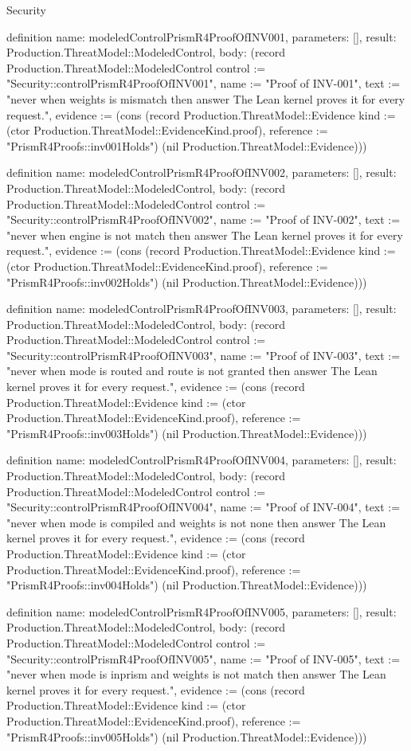 \begin{lexlean}{Security}
\begin{semanticmodule}
definition{
  name: modeledControlPrismR4ProofOfINV001,
  parameters: [],
  result: Production.ThreatModel::ModeledControl,
  body: (record Production.ThreatModel::ModeledControl {control := "Security::controlPrismR4ProofOfINV001", name := "Proof of INV-001", text := "never when weights is mismatch then answer The Lean kernel proves it for every request.", evidence := (cons (record Production.ThreatModel::Evidence {kind := (ctor Production.ThreatModel::EvidenceKind.proof), reference := "PrismR4Proofs::inv001Holds"}) (nil Production.ThreatModel::Evidence))})
}

definition{
  name: modeledControlPrismR4ProofOfINV002,
  parameters: [],
  result: Production.ThreatModel::ModeledControl,
  body: (record Production.ThreatModel::ModeledControl {control := "Security::controlPrismR4ProofOfINV002", name := "Proof of INV-002", text := "never when engine is not match then answer The Lean kernel proves it for every request.", evidence := (cons (record Production.ThreatModel::Evidence {kind := (ctor Production.ThreatModel::EvidenceKind.proof), reference := "PrismR4Proofs::inv002Holds"}) (nil Production.ThreatModel::Evidence))})
}

definition{
  name: modeledControlPrismR4ProofOfINV003,
  parameters: [],
  result: Production.ThreatModel::ModeledControl,
  body: (record Production.ThreatModel::ModeledControl {control := "Security::controlPrismR4ProofOfINV003", name := "Proof of INV-003", text := "never when mode is routed and route is not granted then answer The Lean kernel proves it for every request.", evidence := (cons (record Production.ThreatModel::Evidence {kind := (ctor Production.ThreatModel::EvidenceKind.proof), reference := "PrismR4Proofs::inv003Holds"}) (nil Production.ThreatModel::Evidence))})
}

definition{
  name: modeledControlPrismR4ProofOfINV004,
  parameters: [],
  result: Production.ThreatModel::ModeledControl,
  body: (record Production.ThreatModel::ModeledControl {control := "Security::controlPrismR4ProofOfINV004", name := "Proof of INV-004", text := "never when mode is compiled and weights is not none then answer The Lean kernel proves it for every request.", evidence := (cons (record Production.ThreatModel::Evidence {kind := (ctor Production.ThreatModel::EvidenceKind.proof), reference := "PrismR4Proofs::inv004Holds"}) (nil Production.ThreatModel::Evidence))})
}

definition{
  name: modeledControlPrismR4ProofOfINV005,
  parameters: [],
  result: Production.ThreatModel::ModeledControl,
  body: (record Production.ThreatModel::ModeledControl {control := "Security::controlPrismR4ProofOfINV005", name := "Proof of INV-005", text := "never when mode is inprism and weights is not match then answer The Lean kernel proves it for every request.", evidence := (cons (record Production.ThreatModel::Evidence {kind := (ctor Production.ThreatModel::EvidenceKind.proof), reference := "PrismR4Proofs::inv005Holds"}) (nil Production.ThreatModel::Evidence))})
}


\end{semanticmodule}
\end{lexlean}
